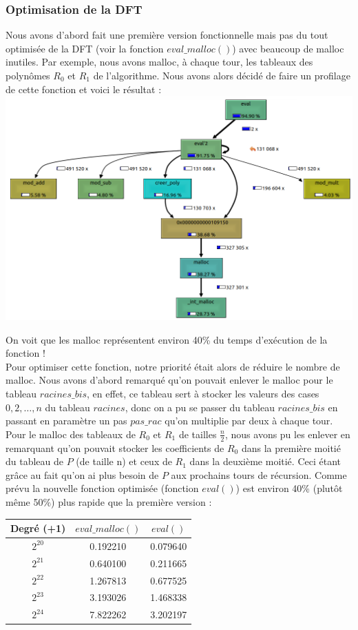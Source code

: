 \documentclass[12pt, a4paper]{article}
\begin{document}
\subsubsection{Optimisation de la DFT}
Nous avons d'abord fait une première version fonctionnelle mais pas du tout optimisée de la DFT (voir la fonction $eval\_malloc()$) avec beaucoup de malloc inutiles. Par exemple, nous avons malloc, à chaque tour, les tableaux des polynômes $R_0$ et $R_1$ de l'algorithme. Nous avons alors décidé de faire un profilage de cette fonction et voici le résultat :
\includegraphics[scale=0.8]{profiler_eval_malloc}

On voit que les malloc représentent environ 40\% du temps d'exécution de la fonction ! \\
Pour optimiser cette fonction, notre priorité était alors de réduire le nombre de malloc. Nous avons d'abord remarqué qu'on pouvait enlever le malloc pour le tableau $racines\_bis$, en effet, ce tableau sert à stocker les valeurs des cases $0,2,\dots,n$ du tableau $racines$, donc on a pu se passer du tableau $racines\_bis$ en passant en paramètre un pas $pas\_rac$ qu'on multiplie par deux à chaque tour. \\
Pour le malloc des tableaux de $R_0$ et $R_1$ de tailles $\frac{n}{2}$, nous avons pu les enlever en remarquant qu'on pouvait stocker les coefficients de $R_0$ dans la première moitié du tableau de $P$ (de taille n) et ceux de $R_1$ dans la deuxième moitié. Ceci étant grâce au fait qu'on ai plus besoin de $P$ aux prochains tours de récursion.
Comme prévu la nouvelle fonction optimisée (fonction $eval()$) est environ 40\% (plutôt même 50$\%$) plus rapide que la première version :

\begin{center}
\begin{tabular}{||c c c||}
\hline
Degré (+1) & $eval\_malloc()$ & $eval()$ \\
\hline\hline
$2^{20}$ & 0.192210 & 0.079640 \\
\hline
$2^{21}$ & 0.640100 & 0.211665 \\
\hline
$2^{22}$ & 1.267813 & 0.677525 \\
\hline
$2^{23}$ & 3.193026 & 1.468338 \\
\hline
$2^{24}$ & 7.822262 & 3.202197 \\
\hline
\end{tabular}
\end{center}
\end{document}

